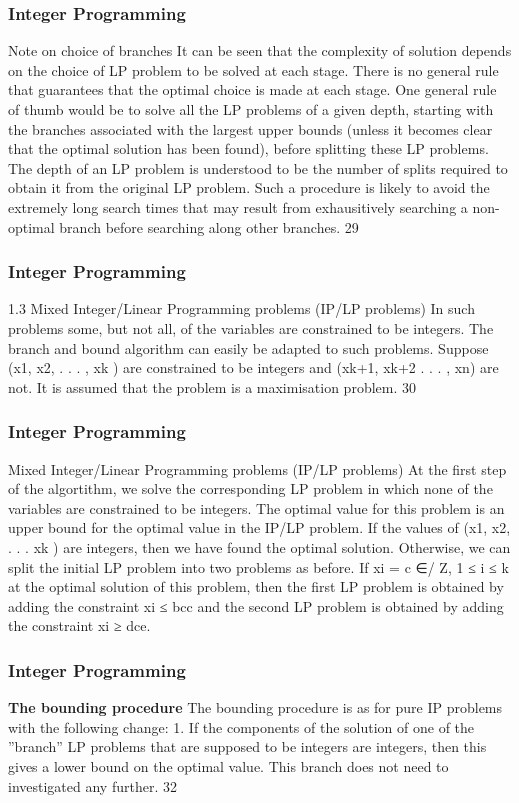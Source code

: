 \begin{frame} 
\frametitle{Integer Programming}     
Note on choice of branches
It can be seen that the complexity of solution depends on the
choice of LP problem to be solved at each stage. There is no
general rule that guarantees that the optimal choice is made at
each stage.
One general rule of thumb would be to solve all the LP problems
of a given depth, starting with the branches associated with the
largest upper bounds (unless it becomes clear that the optimal
solution has been found), before splitting these LP problems.
The depth of an LP problem is understood to be the number of
splits required to obtain it from the original LP problem. Such a
procedure is likely to avoid the extremely long search times that
may result from exhausitively searching a non-optimal branch
before searching along other branches.
29 
\end{frame}  
\begin{frame}
\frametitle{Integer Programming}     
1.3 Mixed Integer/Linear Programming problems (IP/LP
problems)
In such problems some, but not all, of the variables are constrained
to be integers. The branch and bound algorithm can easily be
adapted to such problems.
Suppose (x1, x2, . . . , xk ) are constrained to be integers and
(xk+1, xk+2 . . . , xn) are not. It is assumed that the problem is a
maximisation problem.
30 \end{frame}  \begin{frame} \frametitle{Integer Programming}     
Mixed Integer/Linear Programming problems (IP/LP
problems)
At the first step of the algortithm, we solve the corresponding LP
problem in which none of the variables are constrained to be
integers.
The optimal value for this problem is an upper bound for the
optimal value in the IP/LP problem. If the values of (x1, x2, . . . xk )
are integers, then we have found the optimal solution.
Otherwise, we can split the initial LP problem into two problems as
before. If xi = c ∈/ Z, 1 ≤ i ≤ k at the optimal solution of this
problem, then the first LP problem is obtained by adding the
constraint xi ≤ bcc and the second LP problem is obtained by
adding the constraint xi ≥ dce.
\end{frame}  
\begin{frame} 
\frametitle{Integer Programming}     
\noindent \textbf{The bounding procedure}
The bounding procedure is as for pure IP problems with the
following change:
1. If the components of the solution of one of the
”branch” LP problems that are supposed to be
integers are integers, then this gives a lower bound
on the optimal value. This branch does not need to
investigated any further.
32 
\end{frame}  
